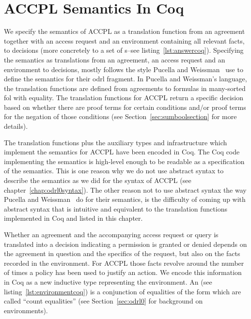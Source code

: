 \chapter{ACCPL Semantics In Coq}\label{chap:accplsemanticscoq}

We specify the semantics of \ac{ACCPL} as a translation function from an agreement together with an access request and an environment containing all relevant facts, to decisions (more concretely to a set of s--see listing~\ref{lst:answercoq}). Specifying the semantics as translations from an agreement, an access request and an environment to decisions, mostly follows the style Pucella and Weissman~\cite{pucella2006} use to define the semantics for their \ac{odrl} fragment. In Pucella and Weissman's language, the translation functions are defined from agreements to formulas in many-sorted \ac{fol} with equality. The translation functions for \ac{ACCPL} return a specific decision based on whether there are proof terms for certain conditions and/or proof terms for the negation of those conditions (see Section~\ref{sec:sumboolsection} for more details).
 

The translation functions plus the auxiliary types and infrastructure which implement the semantics for \ac{ACCPL} have been encoded in Coq. The Coq code implementing the semantics is high-level enough to be readable as a specification of the semantics. This is one reason why we do not use abstract syntax to describe the semantics as we did for the syntax of \ac{ACCPL} (see chapter~\ref{chap:odrl0syntax}). The other reason not to use abstract syntax the way Pucella and Weissman~\cite{pucella2006} do for their semantics, is the difficulty of coming up with abstract syntax that is intuitive and equivalent to the translation functions implemented in Coq and listed in this chapter.

Whether an agreement and the accompanying access request or query is translated into a decision indicating a permission is granted or denied depends on the agreement in question and the specifics of the request, but also on the facts recorded in the environment. For \ac{ACCPL} those facts revolve around the number of times a policy has been used to justify an action. We encode this information in Coq as a new inductive type representing the environment. An  (see listing~\ref{lst:environmentcoq}) is a conjunction of equalities of the form  which are called ``count equalities'' (see Section~\ref{sec:odrl0} for background on environments).


